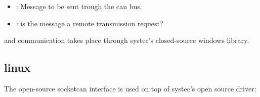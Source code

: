 \documentclass[letterpaper,10pt,english]{sphinxmanual}
\begin{document}
\begin{fulllineitems}
\begin{fulllineitems}
\begin{description}
\begin{itemize}
\item {} 
: Message to be sent trough the can bus. 

\item {} 
: is the message a remote transmission request? 

\end{itemize}

\end{description}


\end{fulllineitems}


\end{fulllineitems}


and communication takes place through systec’s closed-source windows library.


\subsection{linux}
\label{\detokenize{vendors/systec:linux}}
The open-source socketcan interface is used on top of systec’s open source driver:
\end{document}
